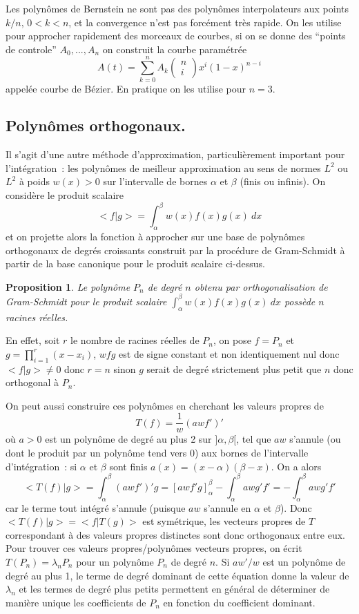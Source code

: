 \documentclass[a4paper,11pt]{article}
\newtheorem{prop}[thm]{Proposition}
\begin{document}
\begin{giacjshere}
Les polyn\^omes de Bernstein ne sont pas des polyn\^omes
interpolateurs aux points $k/n, \, 0<k<n$, et la convergence
n'est pas forc\'ement tr\`es rapide.
On les utilise pour approcher rapidement des morceaux de
courbes, si on se donne des ``points de controle'' $A_0, ..., A_n$
on construit la courbe param\'etr\'ee
$$ A(t) = \sum_{k=0}^n A_k \left( \begin{array}{c} n\\ i \end{array} \right) x^i
(1-x)^{n-i} $$
appel\'ee courbe de B\'ezier. En pratique on les utilise pour $n=3$.

\subsection{Polynômes orthogonaux.}
Il s'agit d'une autre m\'ethode d'approximation, 
particuli\`erement important pour l'int\'egration~: les polyn\^omes
de meilleur approximation au sens de normes $L^2$ ou $L^2$
\`a poids $w(x)>0$ sur l'intervalle de bornes $\alpha$ et $\beta$
(finis ou infinis). 
On consid\`ere le produit scalaire
$$ <f|g>=\int_\alpha^\beta w(x) f(x)g(x) \ dx$$
et on projette alors la fonction \`a approcher 
sur une base de polyn\^omes orthogonaux
de degr\'es croissants construit par la proc\'edure
de Gram-Schmidt \`a partir de la base canonique
pour le produit scalaire ci-dessus.

\begin{prop}
Le polyn\^ome $P_n$ de degr\'e $n$
obtenu par orthogonalisation de Gram-Schmidt
pour le produit scalaire $\int_\alpha^\beta w(x) f(x)g(x) \ dx$
poss\`ede $n$ racines r\'eelles.
\end{prop}
En effet, soit $r$ le nombre de racines r\'eelles de $P_n$, on pose $f=P_n$ et 
$g=\prod_{i=1}^r (x-x_i)$, $wfg$ est de signe constant
et non identiquement nul donc $<f|g> \neq 0$ donc
$r=n$ sinon $g$ serait de degr\'e strictement plus petit que $n$
donc orthogonal \`a $P_n$.

On peut aussi construire ces polyn\^omes en cherchant les valeurs
propres de
$$ T(f)=\frac{1}{w} (awf')'$$
o\`u $a>0$ est un polyn\^ome de degr\'e au plus 2
sur $]\alpha,\beta[$, tel que $aw$ s'annule (ou dont le produit
par un polyn\^ome tend vers 0) 
aux bornes de l'intervalle d'int\'egration~: si $\alpha$ et $\beta$ sont finis
$a(x)=(x-\alpha)(\beta-x)$.
On a alors
$$ <T(f)|g>=\int_\alpha^\beta (awf')'g =
[awf'g]_\alpha^\beta-\int_\alpha^\beta awg'f'
=-\int_\alpha^\beta awg'f'$$
car le terme tout int\'egr\'e s'annule 
(puisque $aw$ s'annule en $\alpha$ et $\beta$). Donc $<T(f)|g>=<f|T(g)>$
est sym\'etrique, les vecteurs propres de $T$ correspondant \`a des
valeurs propres distinctes sont donc orthogonaux entre eux.
Pour trouver ces valeurs propres/polyn\^omes vecteurs propres, on
\'ecrit $T(P_n)=\lambda_n P_n$ pour un polyn\^ome $P_n$ de degr\'e
$n$. Si $aw'/w$ est un polyn\^ome de degr\'e au plus 1, 
le terme de degr\'e dominant de cette \'equation
donne la valeur de $\lambda_n$ et les termes de degr\'e plus petits
permettent en g\'en\'eral de d\'eterminer de mani\`ere unique les
coefficients de $P_n$ en fonction du coefficient dominant.


\end{giacjshere}
\end{document}
